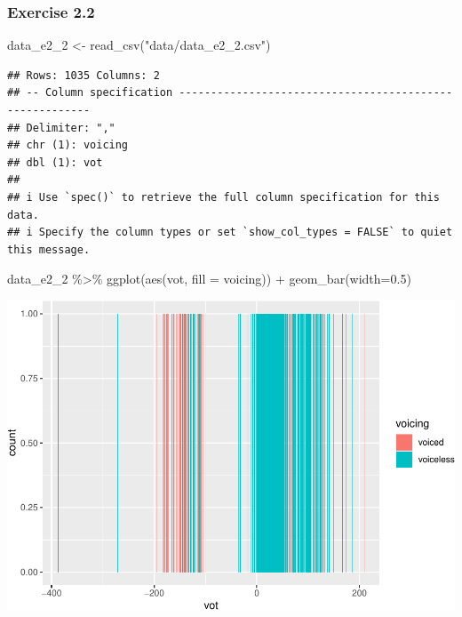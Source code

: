 \documentclass[
]{article}
\newenvironment{Shaded}{\begin{snugshade}}{\end{snugshade}}
\newcommand{\AttributeTok}[1]{\textcolor[rgb]{0.77,0.63,0.00}{#1}}
\newcommand{\FloatTok}[1]{\textcolor[rgb]{0.00,0.00,0.81}{#1}}
\newcommand{\FunctionTok}[1]{\textcolor[rgb]{0.00,0.00,0.00}{#1}}
\newcommand{\NormalTok}[1]{#1}
\newcommand{\OtherTok}[1]{\textcolor[rgb]{0.56,0.35,0.01}{#1}}
\newcommand{\SpecialCharTok}[1]{\textcolor[rgb]{0.00,0.00,0.00}{#1}}
\newcommand{\StringTok}[1]{\textcolor[rgb]{0.31,0.60,0.02}{#1}}
\begin{document}
\hypertarget{exercise-2.2}{%
\subsubsection{Exercise 2.2}\label{exercise-2.2}}

\begin{Shaded}
\begin{Highlighting}[]
\NormalTok{data\_e2\_2 }\OtherTok{\textless{}{-}} \FunctionTok{read\_csv}\NormalTok{(}\StringTok{"data/data\_e2\_2.csv"}\NormalTok{)}
\end{Highlighting}
\end{Shaded}

\begin{verbatim}
## Rows: 1035 Columns: 2
## -- Column specification --------------------------------------------------------
## Delimiter: ","
## chr (1): voicing
## dbl (1): vot
## 
## i Use `spec()` to retrieve the full column specification for this data.
## i Specify the column types or set `show_col_types = FALSE` to quiet this message.
\end{verbatim}

\begin{Shaded}
\begin{Highlighting}[]
\NormalTok{data\_e2\_2 }\SpecialCharTok{\%\textgreater{}\%}
  \FunctionTok{ggplot}\NormalTok{(}\FunctionTok{aes}\NormalTok{(vot, }\AttributeTok{fill =}\NormalTok{ voicing)) }\SpecialCharTok{+}
  \FunctionTok{geom\_bar}\NormalTok{(}\AttributeTok{width=}\FloatTok{0.5}\NormalTok{)}
\end{Highlighting}
\end{Shaded}

\includegraphics{analysis_files/figure-latex/e2-2-1.pdf}
\end{document}
